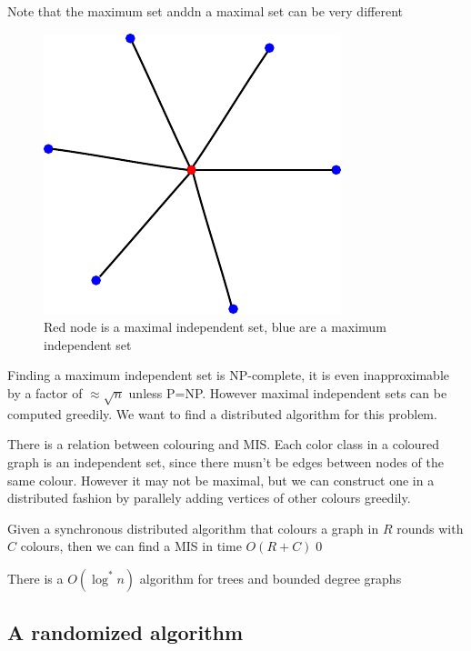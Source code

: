 Note that the maximum set anddn a maximal set can be very different 

\begin{figure}[hbt]
\begin{center}
\includegraphics{./images/mis}
\end{center}
\caption{Red node is a maximal independent set, blue are a maximum independent set}
\end{figure}


Finding a maximum independent set is NP-complete, it is even inapproximable by a factor of $\approx \sqrt{n}$ unless P=NP. However maximal independent sets can be computed greedily. We want  to find a distributed algorithm for this problem.

There is a relation between colouring and MIS. Each color class in a coloured graph is an independent set, since there musn't be edges between nodes of the same colour. However it may not be maximal, but we can construct one in a distributed fashion by parallely adding vertices of other colours greedily.

\begin{thm} Given a synchronous distributed algorithm that colours a graph in $R$ rounds with $C$ colours, then we can find a MIS in time $O(R+C)$\qed\end{thm}

\begin{cor} There is a $O(\log^* n)$ algorithm for trees and bounded degree graphs\end{cor}

\subsection{A randomized algorithm}

